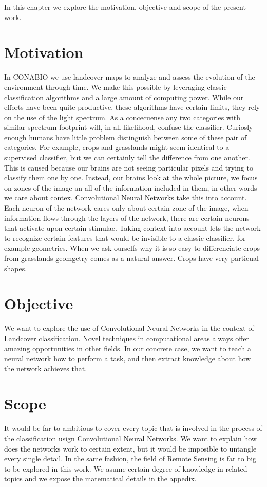 In this chapter we explore the motivation, objective and scope of the present work. 


\section{Motivation}

In CONABIO we use landcover maps to analyze and assess the evolution of the environment through time. We make this possible by leveraging classic classification algorithms and a large amount of computing power. While our efforts have been quite productive, these algorithms have certain limits, they rely on the use of the light spectrum. As a concecuense any two categories with similar spectrum footprint will, in all likelihood, confuse the classifier. Curiosly enough humans have little problem distinguish between some of these pair of categories. For example, crops and grasslands might seem identical to a supervised classifier, but we can certainly tell the difference from one another. This is caused because our brains are not seeing particular pixels and trying to classify them one by one. Instead, our brains look at the whole picture, we focus on zones of the image an all of the information included in them, in other words we care about contex. Convolutional Neural Networks take this into account. Each neuron of the network cares only about certain zone of the image, when information flows through the layers of the network, there are certain neurons that activate upon certain stimulae. Taking context into account lets the network to recognize certain features that would be invisible to a classic classifier, for example geometries. When we ask ourselfs why it is so easy to differenciate crops from grasslands geomgetry comes as a natural answer. Crops have very particual shapes.

\section{Objective}

We want to explore the use of Convolutional Neural Networks in the context of Landcover classification. Novel techniques in computational areas always offer amazing opportunities in other fields. In our concrete case, we want to teach a neural network how to perform a task, and then extract knowledge about how the network achieves that.



\section{Scope}

It would be far to ambitious to cover every topic that is involved in the process of the classification usign Convolutional Neural Networks. We want to explain how does the networks work to certain extent, but it would be imposible to untangle every single detail. In the same fashion, the field of Remote Sensing is far to big to be explored in this work. We asume certain degree of knowledge in related topics and we expose the matematical details in the appedix.